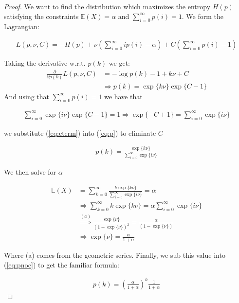 \documentclass[]{article}
\theoremstyle{mattstyle}
\theoremstyle{definition}
\begin{document}
\begin{proof}
We want to find the distribution which maximizes the entropy $H(p)$ satisfying the constraints $\mathbb{E}(X)=\alpha$ and $\sum_{i=0}^{\infty}p(i)=1$. We form the Lagrangian:

\begin{align*}
L(p,\nu, C)=-H(p)+\nu \left(\sum_{i=0}^{\infty} ip(i)-\alpha\right) + C\left( \sum_{i=0}^{\infty}p(i)-1 \right)
\end{align*}

Taking the derivative w.r.t. $p(k)$ we get:
\begin{align}\label{eq:p}
\frac{\partial}{\partial p(k)}L(p,\nu, C)&= -\log p(k) - 1 + k\nu + C\\
&\Rightarrow p(k) = \exp\{k\nu\}\exp\{C-1\}
\end{align}
And using that $\sum_{i=0}^{\infty}p(i)=1$ we have that

\begin{align}\label{eq:cterm}
\sum_{i=0}^{\infty}\exp\{i\nu\}\exp\{C-1\}
= 1 \Rightarrow \exp\{-C+1\} = \sum_{i=0}^{\infty}\exp\{i\nu\}
\end{align}

we substitute (\ref{eq:cterm}) into (\ref{eq:p}) to eliminate $C$

\begin{align}\label{eq:pnoc}
p(k)=\frac{\exp\{k\nu\}}{\sum_{i=0}^{\infty}\exp\{i\nu\}}
\end{align}

We then solve for $\alpha$

\begin{align*}
\mathbb{E}(X)&=\sum_{k=0}^{\infty}\frac{k\exp\{k\nu\}}{\sum_{i=0}^{\infty}\exp\{i\nu\}}=\alpha\\
&\Rightarrow \sum_{k=0}^{\infty}k\exp\{k\nu\}=\alpha\sum_{i=0}^{\infty}\exp\{i\nu\}\\
&\overset{(a)}{\Rightarrow} \frac{\exp\{\nu\}}{(1-\exp\{\nu\})^2} = \frac{\alpha}{(1-\exp\{\nu\})}\\
&\Rightarrow \exp\{\nu\} = \frac{\alpha}{1+\alpha}
\end{align*}

Where (a) comes from the geometric series. Finally, we sub this value into (\ref{eq:pnoc}) to get the familiar formula:

\begin{align}
p(k)=\left(\frac{\alpha}{1+\alpha}\right)^k\frac{1}{1+\alpha}
\end{align}
\end{proof}
\end{document}
